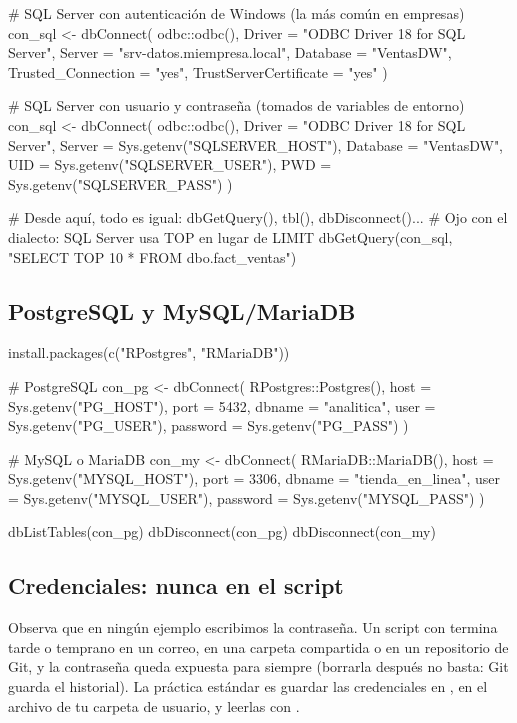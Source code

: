 \begin{rnoejecutar}
# SQL Server con autenticación de Windows (la más común en empresas)
con_sql <- dbConnect(
  odbc::odbc(),
  Driver   = "ODBC Driver 18 for SQL Server",
  Server   = "srv-datos.miempresa.local",
  Database = "VentasDW",
  Trusted_Connection = "yes",
  TrustServerCertificate = "yes"
)

# SQL Server con usuario y contraseña (tomados de variables de entorno)
con_sql <- dbConnect(
  odbc::odbc(),
  Driver   = "ODBC Driver 18 for SQL Server",
  Server   = Sys.getenv("SQLSERVER_HOST"),
  Database = "VentasDW",
  UID      = Sys.getenv("SQLSERVER_USER"),
  PWD      = Sys.getenv("SQLSERVER_PASS")
)

# Desde aquí, todo es igual: dbGetQuery(), tbl(), dbDisconnect()...
# Ojo con el dialecto: SQL Server usa TOP en lugar de LIMIT
dbGetQuery(con_sql, "SELECT TOP 10 * FROM dbo.fact_ventas")
\end{rnoejecutar}

\subsection{PostgreSQL y MySQL/MariaDB}

\begin{rnoejecutar}
install.packages(c("RPostgres", "RMariaDB"))

# PostgreSQL
con_pg <- dbConnect(
  RPostgres::Postgres(),
  host     = Sys.getenv("PG_HOST"),
  port     = 5432,
  dbname   = "analitica",
  user     = Sys.getenv("PG_USER"),
  password = Sys.getenv("PG_PASS")
)

# MySQL o MariaDB
con_my <- dbConnect(
  RMariaDB::MariaDB(),
  host     = Sys.getenv("MYSQL_HOST"),
  port     = 3306,
  dbname   = "tienda_en_linea",
  user     = Sys.getenv("MYSQL_USER"),
  password = Sys.getenv("MYSQL_PASS")
)

dbListTables(con_pg)
dbDisconnect(con_pg)
dbDisconnect(con_my)
\end{rnoejecutar}

\subsection{Credenciales: nunca en el script}

Observa que en ningún ejemplo escribimos la contraseña. Un script con
 termina tarde o temprano en un correo, en
una carpeta compartida o en un repositorio de Git, y la contraseña queda
expuesta para siempre (borrarla después no basta: Git guarda el historial).
La práctica estándar es guardar las credenciales en
, en el archivo  de tu
carpeta de usuario, y leerlas con .

